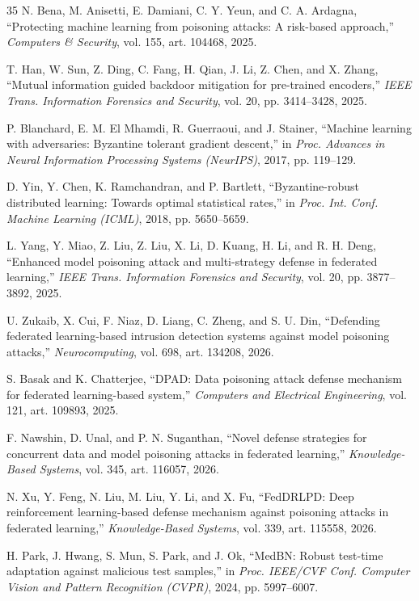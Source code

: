 \documentclass[journal]{IEEEtran}
\begin{document}
\begin{thebibliography}{35}
N. Bena, M. Anisetti, E. Damiani, C. Y. Yeun, and C. A. Ardagna, ``Protecting
machine learning from poisoning attacks: A risk-based approach,'' \emph{Computers
\& Security}, vol. 155, art. 104468, 2025.

T. Han, W. Sun, Z. Ding, C. Fang, H. Qian, J. Li, Z. Chen, and X. Zhang, ``Mutual
information guided backdoor mitigation for pre-trained encoders,'' \emph{IEEE Trans.
Information Forensics and Security}, vol. 20, pp. 3414--3428, 2025.

P. Blanchard, E. M. El Mhamdi, R. Guerraoui, and J. Stainer, ``Machine learning with
adversaries: Byzantine tolerant gradient descent,'' in \emph{Proc. Advances in Neural
Information Processing Systems (NeurIPS)}, 2017, pp. 119--129.

D. Yin, Y. Chen, K. Ramchandran, and P. Bartlett, ``Byzantine-robust distributed
learning: Towards optimal statistical rates,'' in \emph{Proc. Int. Conf. Machine
Learning (ICML)}, 2018, pp. 5650--5659.

L. Yang, Y. Miao, Z. Liu, Z. Liu, X. Li, D. Kuang, H. Li, and R. H. Deng,
``Enhanced model poisoning attack and multi-strategy defense in federated
learning,'' \emph{IEEE Trans. Information Forensics and Security}, vol. 20,
pp. 3877--3892, 2025.

U. Zukaib, X. Cui, F. Niaz, D. Liang, C. Zheng, and S. U. Din, ``Defending federated
learning-based intrusion detection systems against model poisoning attacks,''
\emph{Neurocomputing}, vol. 698, art. 134208, 2026.

S. Basak and K. Chatterjee, ``DPAD: Data poisoning attack defense mechanism for
federated learning-based system,'' \emph{Computers and Electrical Engineering},
vol. 121, art. 109893, 2025.

F. Nawshin, D. Unal, and P. N. Suganthan, ``Novel defense strategies for concurrent
data and model poisoning attacks in federated learning,'' \emph{Knowledge-Based
Systems}, vol. 345, art. 116057, 2026.

N. Xu, Y. Feng, N. Liu, M. Liu, Y. Li, and X. Fu, ``FedDRLPD: Deep reinforcement
learning-based defense mechanism against poisoning attacks in federated learning,''
\emph{Knowledge-Based Systems}, vol. 339, art. 115558, 2026.

H. Park, J. Hwang, S. Mun, S. Park, and J. Ok, ``MedBN: Robust test-time adaptation
against malicious test samples,'' in \emph{Proc. IEEE/CVF Conf. Computer Vision and
Pattern Recognition (CVPR)}, 2024, pp. 5997--6007.


\end{thebibliography}
\end{document}
